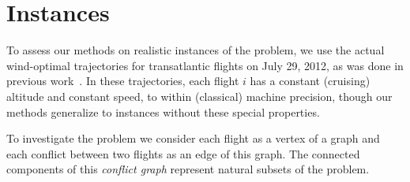 \section{Instances}
To assess our methods on realistic instances of the problem, we use the actual wind-optimal trajectories for transatlantic flights on July 29, 2012, as was done in previous work~\cite{rodionova16}.
In these trajectories, each flight $i$ has a constant (cruising) altitude 
and constant speed, to within (classical) machine precision,
though our methods generalize to instances without these special properties.

To investigate the problem we consider each flight as a vertex of a graph and each conflict between two flights as an edge of this graph.
The connected components of this \emph{conflict graph} represent natural subsets of the problem.


